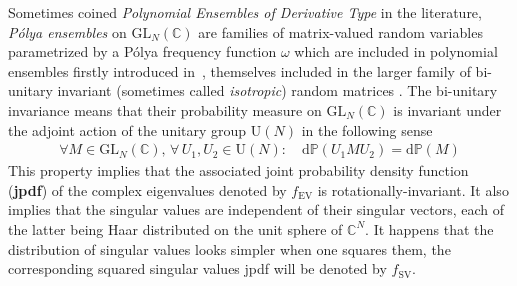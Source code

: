 \documentclass[pdflatex,sn-mathphys-num]{sn-jnl}
\theoremstyle{thmstyleone}
\numberwithin{equation}{section}
\newcommand{\C}{\mathbb{C}}
\begin{document}
 
Sometimes coined \textit{Polynomial Ensembles of Derivative Type} in the literature, \textit{P\'olya ensembles} on $\mathrm{GL}_{N}\left(\C\right)$ are families of matrix-valued random variables parametrized by a P\'olya frequency function $\omega$ which are included in polynomial ensembles firstly introduced in~\cite{kuijlaarsTransformationsPolynomialEnsembles2016}, themselves included in the larger family of bi-unitary invariant (sometimes called \textit{isotropic}) random matrices \cite{kieburgProductsRandomMatrices2019,forsterPolynomialEnsemblesPolya2021}. 
The bi-unitary invariance means that their probability measure on $\mathrm{GL}_{N}\left(\C\right)$ is invariant under the adjoint action of the unitary group $\mathrm{U}(N)$ in the following sense
\begin{align}\label{def:biUinvariance}
    \forall M\in\mathrm{GL}_{N}\left(\C\right),\,\forall\, U_{1},U_{2} \in\mathrm{U}(N):\quad \mathrm{d}\mathbb{P}\left ( U_{1}MU_{2} \right )=\mathrm{d}\mathbb{P}\left ( M \right )
\end{align}
This property implies that the associated joint probability density function (\textbf{jpdf}) of the  complex eigenvalues denoted by $f_{\mathrm{EV}}$ is rotationally-invariant. It also implies that the singular values are independent of their singular vectors, each of the latter being Haar distributed on the unit sphere of $\C^{N}$. It happens that the distribution of singular values looks simpler when one squares them, the corresponding squared singular values jpdf will be denoted by  $f_{\mathrm{SV}}$. %
 
\end{document}
